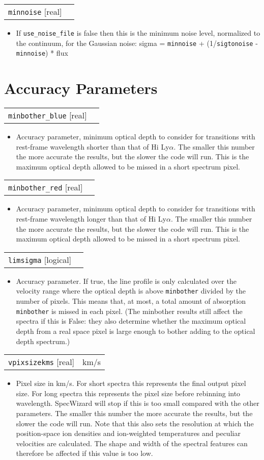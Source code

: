 \documentclass{report}
\makeatletter
\newcommand{\paramdefinition}[3]{
\begin{tabular*}{\textwidth}{l@{\extracolsep{\fill}}r}
		{\tt #1} [{\sc #2}]& #3 \\
\end{tabular*}}
\newcommand{\paramdescription}[1]{
\begin{itemize}
\item #1
\end{itemize}\vspace{0.2cm}}
\makeatother
\begin{document}
\paramdefinition{minnoise}{real}{}
\paramdescription{If {\tt use\_noise\_file} is false then this is the minimum noise level, normalized to the continuum, for the Gaussian noise: sigma = {\tt minnoise} + (1/{\tt sigtonoise} - {\tt minnoise}) * flux}

\section{Accuracy Parameters}

\paramdefinition{minbother\_blue}{real}{}
\paramdescription{Accuracy parameter, minimum optical depth to consider for transitions with rest-frame wavelength shorter than that of H{\sc i} Ly$\alpha$.  The smaller this number the more accurate the results, but the slower the code will run. This is the maximum optical depth allowed to be missed in a short spectrum pixel.}

\paramdefinition{minbother\_red}{real}{}
\paramdescription{Accuracy parameter, minimum optical depth to consider for transitions with rest-frame wavelength longer than that of H{\sc i} Ly$\alpha$.  The smaller this number the more accurate the results, but the slower the code will run. This is the maximum optical depth allowed to be missed in a short spectrum pixel.}

\paramdefinition{limsigma}{logical}{}
\paramdescription{Accuracy parameter. If true, the line profile is only calculated over the velocity range where the optical depth is above {\tt minbother} divided by the number of pixels. This means that, at most, a total amount of absorption {\tt minbother} is missed in each pixel. (The minbother results still affect the spectra if this is False: they also determine whether the maximum optical depth from a real space pixel is large enough to bother adding to the optical depth spectrum.)}

\paramdefinition{vpixsizekms}{real}{km/s}
\paramdescription{Pixel size in km/s.  For short spectra this represents the final output pixel size.  For long spectra this represents the pixel size before rebinning into wavelength. SpecWizard will stop if this is too small compared with the other parameters. The smaller this number the more accurate the results, but the slower the code will run. Note that this also sets the resolution at which the position-space ion densities and ion-weighted temperatures and peculiar velocities are calculated. The shape and width of the spectral features can therefore be affected if this value is too low.}
\end{document}
